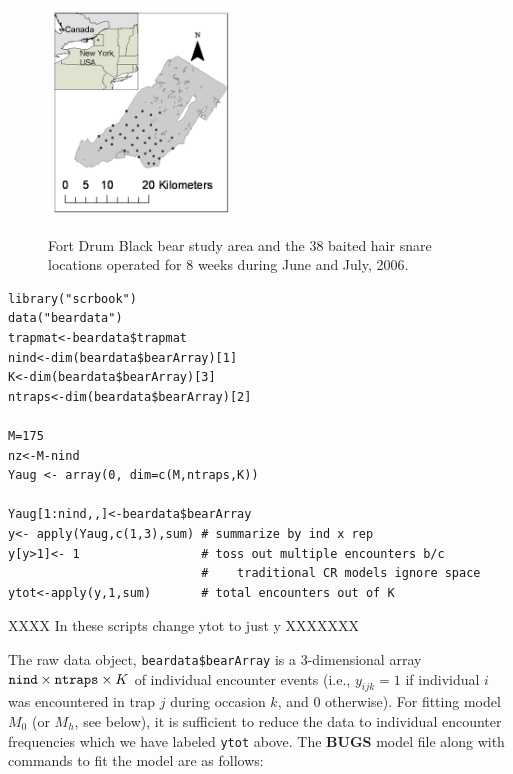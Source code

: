 \begin{figure}
\centering
\includegraphics[height=2.5in,width=1.9in]{Ch3/figs/hairsnares.png}
\caption{Fort Drum Black bear study area and the 38 baited hair snare
  locations operated for 8 weeks during June and July, 2006.}
\label{fig.3.bears1}
\end{figure}

{\small
\begin{verbatim}
library("scrbook")
data("beardata")
trapmat<-beardata$trapmat
nind<-dim(beardata$bearArray)[1]
K<-dim(beardata$bearArray)[3]
ntraps<-dim(beardata$bearArray)[2]

M=175
nz<-M-nind
Yaug <- array(0, dim=c(M,ntraps,K))

Yaug[1:nind,,]<-beardata$bearArray
y<- apply(Yaug,c(1,3),sum) # summarize by ind x rep
y[y>1]<- 1                 # toss out multiple encounters b/c
                           #    traditional CR models ignore space
ytot<-apply(y,1,sum)       # total encounters out of K
\end{verbatim}
}

XXXX In these scripts change ytot to just y XXXXXXX

The raw data object, \mbox{\tt beardata\$bearArray} is a 3-dimensional
array $\mbox{\tt nind} \times \mbox{\tt ntraps} \times K$ of
individual encounter events (i.e., $y_{ijk} = 1$ if individual $i$ was
encountered in trap $j$ during occasion $k$, and 0 otherwise).  For
fitting model $M_{0}$ (or $M_{h}$, see below), it is sufficient to
reduce the data to individual encounter frequencies which we have
labeled \mbox{\tt ytot} above.  The {\bf BUGS} model file along with
commands to fit the model are as follows:

